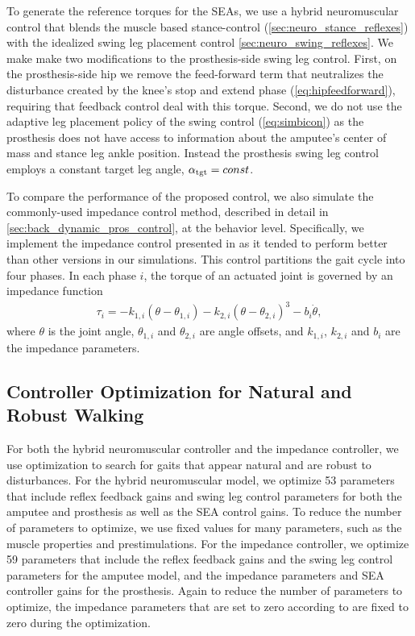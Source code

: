 To generate the reference torques for the SEAs, we use a hybrid neuromuscular
control that blends the muscle based stance-control
(\cref{sec:neuro_stance_reflexes}) with the idealized swing leg placement
control \cref{sec:neuro_swing_reflexes}. We make make two modifications to the
prosthesis-side swing leg control.  First, on the prosthesis-side hip we remove
the feed-forward term that neutralizes the disturbance created by the knee's
stop and extend phase (\cref{eq:hipfeedforward}), requiring that feedback
control deal with this torque.  Second, we do not use the adaptive leg placement
policy of the swing control (\cref{eq:simbicon}) as the prosthesis does not have
access to information about the amputee's center of mass and stance leg ankle
position.  Instead the prosthesis swing leg control employs a constant target
leg angle, $\alpha_{\mathrm{tgt}} = const$.

To compare the performance of the proposed control, we also simulate the
commonly-used impedance control method, described in detail in
\cref{sec:back_dynamic_pros_control}, at the behavior level.  Specifically, we
implement the impedance control presented in \citet{sup2008design} as it tended
to perform better than other versions in our simulations. This control
partitions the gait cycle into four phases. In each phase $i$, the torque of an
actuated joint is governed by an impedance function
\begin{align} 
    \tau_i = -k_{1,i} (\theta - \theta_{1,i}) - k_{2,i} 
        (\theta - \theta_{2,i})^3 - b_i \dot{\theta} , 
\end{align} 
where $\theta$ is the joint angle, $\theta_{1,i}$ and $\theta_{2,i}$ are angle
offsets, and $k_{1,i}$, $k_{2,i}$ and $b_i$ are the impedance parameters.  

\subsection{Controller Optimization for Natural and Robust Walking}
    \label{sec:completed_comparison_opt}

For both the hybrid neuromuscular controller and the impedance controller, we
use optimization to search for gaits that appear natural and are robust to
disturbances. For the hybrid neuromuscular model, we optimize 53 parameters that
include reflex feedback gains and swing leg control parameters for both the
amputee and prosthesis as well as the SEA control gains. To reduce the number of
parameters to optimize, we use fixed values for many parameters, such as the
muscle properties and prestimulations. For the impedance controller, we optimize
59 parameters that include the reflex feedback gains and the swing leg control
parameters for the amputee model, and the impedance parameters and SEA
controller gains for the prosthesis. Again to reduce the number of parameters to
optimize, the impedance parameters that are set to zero according to
\citet{sup2008design} are fixed to zero during the optimization. 

